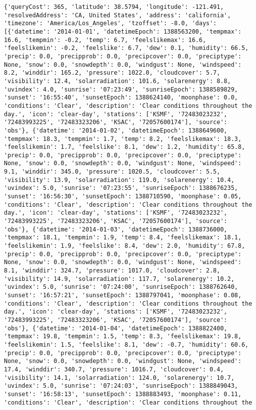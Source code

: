 \documentclass[
  letterpaper,
  DIV=11,
  numbers=noendperiod]{scrartcl}
\begin{document}
\begin{verbatim}
{'queryCost': 365, 'latitude': 38.5794, 'longitude': -121.491, 'resolvedAddress': 'CA, United States', 'address': 'california', 'timezone': 'America/Los_Angeles', 'tzoffset': -8.0, 'days': [{'datetime': '2014-01-01', 'datetimeEpoch': 1388563200, 'tempmax': 16.6, 'tempmin': -0.2, 'temp': 6.7, 'feelslikemax': 16.6, 'feelslikemin': -0.2, 'feelslike': 6.7, 'dew': 0.1, 'humidity': 66.5, 'precip': 0.0, 'precipprob': 0.0, 'precipcover': 0.0, 'preciptype': None, 'snow': 0.0, 'snowdepth': 0.0, 'windgust': None, 'windspeed': 8.2, 'winddir': 165.2, 'pressure': 1022.0, 'cloudcover': 5.7, 'visibility': 12.4, 'solarradiation': 101.6, 'solarenergy': 8.8, 'uvindex': 4.0, 'sunrise': '07:23:49', 'sunriseEpoch': 1388589829, 'sunset': '16:55:40', 'sunsetEpoch': 1388624140, 'moonphase': 0.0, 'conditions': 'Clear', 'description': 'Clear conditions throughout the day.', 'icon': 'clear-day', 'stations': ['KSMF', '72483023232', '72483993225', '72483323206', 'KSAC', '72057600174'], 'source': 'obs'}, {'datetime': '2014-01-02', 'datetimeEpoch': 1388649600, 'tempmax': 18.3, 'tempmin': 1.7, 'temp': 8.2, 'feelslikemax': 18.3, 'feelslikemin': 1.7, 'feelslike': 8.1, 'dew': 1.2, 'humidity': 65.8, 'precip': 0.0, 'precipprob': 0.0, 'precipcover': 0.0, 'preciptype': None, 'snow': 0.0, 'snowdepth': 0.0, 'windgust': None, 'windspeed': 9.1, 'winddir': 345.0, 'pressure': 1020.5, 'cloudcover': 5.5, 'visibility': 13.9, 'solarradiation': 119.0, 'solarenergy': 10.4, 'uvindex': 5.0, 'sunrise': '07:23:55', 'sunriseEpoch': 1388676235, 'sunset': '16:56:30', 'sunsetEpoch': 1388710590, 'moonphase': 0.05, 'conditions': 'Clear', 'description': 'Clear conditions throughout the day.', 'icon': 'clear-day', 'stations': ['KSMF', '72483023232', '72483993225', '72483323206', 'KSAC', '72057600174'], 'source': 'obs'}, {'datetime': '2014-01-03', 'datetimeEpoch': 1388736000, 'tempmax': 18.1, 'tempmin': 1.9, 'temp': 8.4, 'feelslikemax': 18.1, 'feelslikemin': 1.9, 'feelslike': 8.4, 'dew': 2.0, 'humidity': 67.8, 'precip': 0.0, 'precipprob': 0.0, 'precipcover': 0.0, 'preciptype': None, 'snow': 0.0, 'snowdepth': 0.0, 'windgust': None, 'windspeed': 8.1, 'winddir': 324.7, 'pressure': 1017.0, 'cloudcover': 2.8, 'visibility': 14.9, 'solarradiation': 117.7, 'solarenergy': 10.2, 'uvindex': 5.0, 'sunrise': '07:24:00', 'sunriseEpoch': 1388762640, 'sunset': '16:57:21', 'sunsetEpoch': 1388797041, 'moonphase': 0.08, 'conditions': 'Clear', 'description': 'Clear conditions throughout the day.', 'icon': 'clear-day', 'stations': ['KSMF', '72483023232', '72483993225', '72483323206', 'KSAC', '72057600174'], 'source': 'obs'}, {'datetime': '2014-01-04', 'datetimeEpoch': 1388822400, 'tempmax': 19.8, 'tempmin': 1.5, 'temp': 8.3, 'feelslikemax': 19.8, 'feelslikemin': 1.5, 'feelslike': 8.1, 'dew': -0.7, 'humidity': 60.6, 'precip': 0.0, 'precipprob': 0.0, 'precipcover': 0.0, 'preciptype': None, 'snow': 0.0, 'snowdepth': 0.0, 'windgust': None, 'windspeed': 17.4, 'winddir': 340.7, 'pressure': 1016.7, 'cloudcover': 0.4, 'visibility': 14.1, 'solarradiation': 124.0, 'solarenergy': 10.7, 'uvindex': 5.0, 'sunrise': '07:24:03', 'sunriseEpoch': 1388849043, 'sunset': '16:58:13', 'sunsetEpoch': 1388883493, 'moonphase': 0.11, 'conditions': 'Clear', 'description': 'Clear conditions throughout the 
\end{verbatim}
\end{document}
